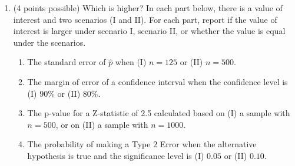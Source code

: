 \documentclass{ccg-topic}
\begin{document}
\begin{enumerate}[resume]
\vfill
\item (4 points possible) Which is higher? In each part below, there is a value of interest and two scenarios (I and II). For each part, report if the value of interest is larger under scenario I, scenario II, or whether the value is equal under the scenarios.
\begin{enumerate}
\item The standard error of $\hat{p}$ when (I) $n = 125$ or (II) $n=500$.

\vfill
\item The margin of error of a confidence interval when the confidence level is (I) $90\%$ or (II) $80\%$.

\vfill
\item The p-value for a Z-statistic of 2.5 calculated based on (I) a sample with $n=500$, or on (II) a sample with $n=1000$.

\vfill
\item The probability of making a Type $2$ Error when the alternative hypothesis is true and the significance level is (I) $0.05$ or (II) $0.10$.

\vfill
\end{enumerate}

\end{enumerate}
\end{document}
